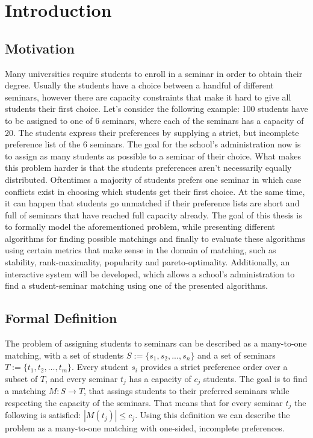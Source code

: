 \section{Introduction}
\label{sec:introduction}

\subsection{Motivation}
Many universities require students to enroll in a seminar in order to obtain their degree. Usually the students have a choice between a handful of different seminars, however there are capacity constraints that make it hard to give all students their first choice. Let's consider the following example: 100 students have to be assigned to one of 6 seminars, where each of the seminars has a capacity of 20. The students express their preferences by supplying a strict, but incomplete preference list of the 6 seminars. The goal for the school's administration now is to assign as many students as possible to a seminar of their choice. 
\newline
What makes this problem harder is that the students preferences aren't necessarily equally distributed. Oftentimes a majority of students prefers one seminar in which case conflicts exist in choosing which students get their first choice. At the same time, it can happen that students go unmatched if their preference lists are short and full of seminars that have reached full capacity already.
\newline
The goal of this thesis is to formally model the aforementioned problem, while presenting different algorithms for finding possible matchings and finally to evaluate these algorithms using certain metrics that make sense in the domain of matching, such as stability, rank-maximality, popularity and pareto-optimality. Additionally, an interactive system will be developed, which allows a school's administration to find a student-seminar matching using one of the presented algorithms. 

\subsection{Formal Definition}
The problem of assigning students to seminars can be described as a many-to-one matching, with a set of students $S:= \{s_1, s_2, ...,s_n\}$ and a set of seminars $T:= \{t_1, t_2, ..., t_m\}$. Every student $s_i$ provides a strict preference order over a subset of $T$, and every seminar $t_j$ has a capacity of $c_j$ students. The goal is to find a matching $M: S \rightarrow T$, that assings students to their preferred seminars while respecting the capacity of the seminars. That means that for every seminar $t_j$ the following is satisfied: $|M(t_j)| \leq c_j$. Using this definition we can describe the problem as a many-to-one matching with one-sided, incomplete preferences.  

